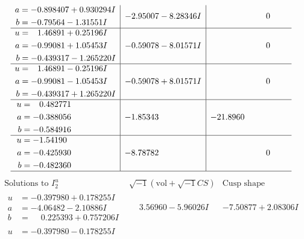 \documentclass[1p]{elsarticle_modified}
\theoremstyle{definition}
\newcommand{\I}{\sqrt{-1}}
\begin{document}
$$\begin{array}{c|c|c}
\begin{aligned}
a &= -0.898407 + 0.930294 I \\
b &= -0.79564 - 1.31551 I\end{aligned}
 & -2.95007 - 8.28346 I & \phantom{-0.000000 } 0 \\ \hline\begin{aligned}
u &= \phantom{-}1.46891 + 0.25196 I \\
a &= -0.99081 + 1.05453 I \\
b &= -0.439317 - 1.265220 I\end{aligned}
 & -0.59078 - 8.01571 I & \phantom{-0.000000 } 0 \\ \hline\begin{aligned}
u &= \phantom{-}1.46891 - 0.25196 I \\
a &= -0.99081 - 1.05453 I \\
b &= -0.439317 + 1.265220 I\end{aligned}
 & -0.59078 + 8.01571 I & \phantom{-0.000000 } 0 \\ \hline\begin{aligned}
u &= \phantom{-}0.482771\phantom{ +0.000000I} \\
a &= -0.388056\phantom{ +0.000000I} \\
b &= -0.584916\phantom{ +0.000000I}\end{aligned}
 & -1.85343\phantom{ +0.000000I} & -21.8960\phantom{ +0.000000I} \\ \hline\begin{aligned}
u &= -1.54190\phantom{ +0.000000I} \\
a &= -0.425930\phantom{ +0.000000I} \\
b &= -0.482360\phantom{ +0.000000I}\end{aligned}
 & -8.78782\phantom{ +0.000000I} & \phantom{-0.000000 } 0\\
 \hline 
 \end{array}$$\newpage$$\begin{array}{c|c|c}  
\text{Solutions to }I^u_{2}& \I (\text{vol} + \sqrt{-1}CS) & \text{Cusp shape}\\
 \hline 
\begin{aligned}
u &= -0.397980 + 0.178255 I \\
a &= -4.06482 - 2.10886 I \\
b &= \phantom{-}0.225393 + 0.757206 I\end{aligned}
 & \phantom{-}3.56960 - 5.96026 I & -7.50877 + 2.08306 I \\ \hline\begin{aligned}
u &= -0.397980 - 0.178255 I \\

\end{aligned}
\end{array}$$
\end{document}
